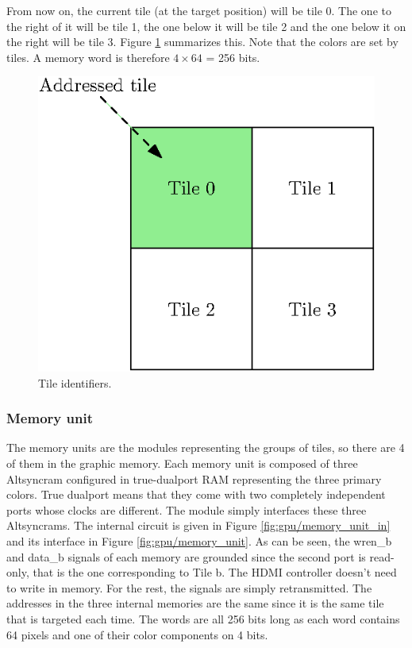 From now on, the current tile (at the target position) will be tile 0. The one to the right of it
will be tile 1, the one below it will be tile 2 and the one below it on the right will be tile 3. 
Figure \ref{fig:gpu/tile_ids} summarizes this. Note that the colors are set by tiles. A memory word 
is therefore $4 \times 64$ = 256 bits.

\begin{figure}[H]
    \centering
    \includegraphics[scale=1.0]{Chapter4-GPU_CLKU/res/tile_ids}
    \caption{Tile identifiers.}
    \label{fig:gpu/tile_ids}
\end{figure}

\subsubsection*{Memory unit}

The memory units are the modules representing the groups of tiles, so there are 4 of them in the 
graphic memory. Each memory unit is composed of three Altsyncram configured in true-dualport RAM 
representing the three primary colors. True dualport means that they come with two completely 
independent ports whose clocks are different. The module simply interfaces these three Altsyncrams. 
The internal circuit is given in Figure \ref{fig:gpu/memory_unit_in} and its interface in Figure 
\ref{fig:gpu/memory_unit}. As can be seen, the wren\_b and data\_b signals 
of each memory are grounded since the second port is read-only, that is the one corresponding to
Tile b. The HDMI controller doesn't need to write in memory. For the rest, the signals are 
simply retransmitted. The addresses in the three internal memories are the same since it is the
same tile that is targeted each time. The words are all 256 bits long as each word contains 64 
pixels and one of their color components on 4 bits. 

